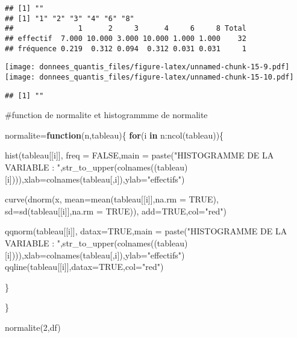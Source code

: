 \documentclass[
]{article}
\newenvironment{Shaded}{\begin{snugshade}}{\end{snugshade}}
\newcommand{\AttributeTok}[1]{\textcolor[rgb]{0.77,0.63,0.00}{#1}}
\newcommand{\ConstantTok}[1]{\textcolor[rgb]{0.00,0.00,0.00}{#1}}
\newcommand{\ControlFlowTok}[1]{\textcolor[rgb]{0.13,0.29,0.53}{\textbf{#1}}}
\newcommand{\DecValTok}[1]{\textcolor[rgb]{0.00,0.00,0.81}{#1}}
\newcommand{\FunctionTok}[1]{\textcolor[rgb]{0.00,0.00,0.00}{#1}}
\newcommand{\NormalTok}[1]{#1}
\newcommand{\OtherTok}[1]{\textcolor[rgb]{0.56,0.35,0.01}{#1}}
\newcommand{\SpecialCharTok}[1]{\textcolor[rgb]{0.00,0.00,0.00}{#1}}
\newcommand{\StringTok}[1]{\textcolor[rgb]{0.31,0.60,0.02}{#1}}
\begin{document}
\begin{verbatim}
## [1] ""
## [1] "1" "2" "3" "4" "6" "8"
##               1      2     3      4     6     8 Total
## effectif  7.000 10.000 3.000 10.000 1.000 1.000    32
## fréquence 0.219  0.312 0.094  0.312 0.031 0.031     1
\end{verbatim}

\texttt{[image: donnees\_quantis\_files/figure-latex/unnamed-chunk-15-9.pdf]}
\texttt{[image: donnees\_quantis\_files/figure-latex/unnamed-chunk-15-10.pdf]}

\begin{verbatim}
## [1] ""
\end{verbatim}

\#function de normalite et histogrammme de normalite

\begin{Shaded}
\begin{Highlighting}[]
\NormalTok{normalite}\OtherTok{=}\ControlFlowTok{function}\NormalTok{(n,tableau)\{}
    \ControlFlowTok{for}\NormalTok{(i }\ControlFlowTok{in}\NormalTok{ n}\SpecialCharTok{:}\FunctionTok{ncol}\NormalTok{(tableau))\{}
  
     \FunctionTok{hist}\NormalTok{(tableau[[i]], }\AttributeTok{freq =} \ConstantTok{FALSE}\NormalTok{,}\AttributeTok{main =} \FunctionTok{paste}\NormalTok{(}\StringTok{"HISTOGRAMME DE  LA VARIABLE : "}\NormalTok{,}\FunctionTok{str\_to\_upper}\NormalTok{(}\FunctionTok{colnames}\NormalTok{((tableau)[i]))),}\AttributeTok{xlab=}\FunctionTok{colnames}\NormalTok{(tableau[,i]),}\AttributeTok{ylab=}\StringTok{"effectifs"}\NormalTok{)}
  
    \FunctionTok{curve}\NormalTok{(}\FunctionTok{dnorm}\NormalTok{(x, }\AttributeTok{mean=}\FunctionTok{mean}\NormalTok{(tableau[[i]],}\AttributeTok{na.rm =} \ConstantTok{TRUE}\NormalTok{), }\AttributeTok{sd=}\FunctionTok{sd}\NormalTok{(tableau[[i]],}\AttributeTok{na.rm =} \ConstantTok{TRUE}\NormalTok{)), }\AttributeTok{add=}\ConstantTok{TRUE}\NormalTok{,}\AttributeTok{col=}\StringTok{"red"}\NormalTok{)}
    
     \FunctionTok{qqnorm}\NormalTok{(tableau[[i]], }\AttributeTok{datax=}\ConstantTok{TRUE}\NormalTok{,}\AttributeTok{main =} \FunctionTok{paste}\NormalTok{(}\StringTok{"HISTOGRAMME DE  LA VARIABLE : "}\NormalTok{,}\FunctionTok{str\_to\_upper}\NormalTok{(}\FunctionTok{colnames}\NormalTok{((tableau)[i]))),}\AttributeTok{xlab=}\FunctionTok{colnames}\NormalTok{(tableau[,i]),}\AttributeTok{ylab=}\StringTok{"effectifs"}\NormalTok{)}
    \FunctionTok{qqline}\NormalTok{(tableau[[i]],}\AttributeTok{datax=}\ConstantTok{TRUE}\NormalTok{,}\AttributeTok{col=}\StringTok{"red"}\NormalTok{)}
    
\NormalTok{  \}}

\NormalTok{\}}

\FunctionTok{normalite}\NormalTok{(}\DecValTok{2}\NormalTok{,df)}
\end{Highlighting}
\end{Shaded}
\end{document}
